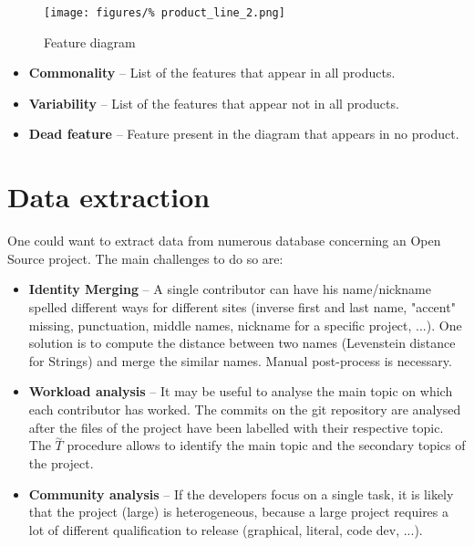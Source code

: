 \documentclass[a4paper,11pt]{report}
\begin{document}
	\begin{figure}[H]
		\centering
		\texttt{[image: figures/\%
			product\_line\_2.png]}
		\caption{Feature diagram}
	\end{figure}\noindent
	\begin{itemize}
		\setlength{\itemsep}{0pt}
		\setlength{\parskip}{0pt}
		\setlength{\parsep}{0pt}
		\item \textbf{Commonality} -- 
			List of the features that appear in all
			products.
		\item \textbf{Variability} -- 
			List of the features that appear not
			in all products.
		\item \textbf{Dead feature} --
			Feature present in the diagram that
			appears in no product.
	\end{itemize}
%
\section{Data extraction}\noindent
	One could want to extract data from numerous database
		concerning an Open Source project. The main
		challenges to do so are:
	\begin{itemize}
		\setlength{\itemsep}{0pt}		
		\setlength{\parskip}{0pt}		
		\setlength{\parsep}{0pt}	
		\item \textbf{Identity Merging} -- 
			A single contributor can have his name/nickname
			spelled different ways for different sites
			(inverse first and last name, "accent" missing,
			punctuation, middle names, nickname for a 
			specific project, ...). One solution
			is to compute the distance between two
			names (Levenstein distance for Strings)
			and merge the similar names. Manual 
			post-process is	necessary.
		\item \textbf{Workload analysis} --
			It may be useful to analyse the main
			topic on which each contributor has 
			worked. The commits on the git repository
			are analysed after the files of the project
			have been labelled with their respective topic.
			The $\overset{\sim}{T}$	procedure allows to
			identify the main topic and the secondary
			topics of the project.
		\item \textbf{Community analysis} -- 
			If the developers focus on a single task,
			it is likely that the project (large) is
			heterogeneous, because a large project requires
			a lot of different qualification to release
			(graphical, literal, code dev, ...).
	\end{itemize}
%
\end{document}
